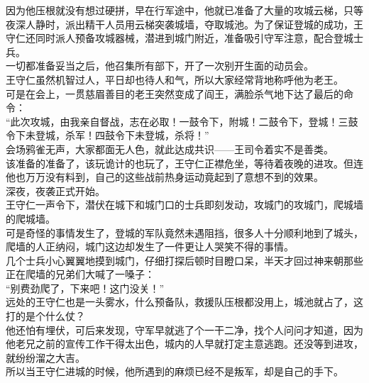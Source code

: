 \begin{multicols}{\theparacolNo}
因为他压根就没有想过硬拼，早在行军途中，他就已准备了大量的攻城云梯，只等夜深人静时，派出精干人员用云梯突袭城墙，夺取城池。为了保证登城的成功，王守仁还同时派人预备攻城器械，潜进到城门附近，准备吸引守军注意，配合登城士兵。\\

一切都准备妥当之后，他召集所有部下，开了一次别开生面的动员会。\\

王守仁虽然机智过人，平日却也待人和气，所以大家经常背地称呼他为老王。\\

可是在会上，一贯慈眉善目的老王突然变成了阎王，满脸杀气地下达了最后的命令：\\

“此次攻城，由我亲自督战，志在必取！一鼓令下，附城！二鼓令下，登城！三鼓令下未登城，杀军！四鼓令下未登城，杀将！”\\

会场鸦雀无声，大家都面无人色，就此达成共识——王司令着实不是善类。\\

该准备的准备了，该玩诡计的也玩了，王守仁正襟危坐，等待着夜晚的进攻。但连他也万万没有料到，自己的这些战前热身运动竟起到了意想不到的效果。\\

深夜，夜袭正式开始。\\

王守仁一声令下，潜伏在城下和城门口的士兵即刻发动，攻城门的攻城门，爬城墙的爬城墙。\\

可是奇怪的事情发生了，登城的军队竟然未遇阻挡，很多人十分顺利地到了城头，爬墙的人正纳闷，城门这边却发生了一件更让人哭笑不得的事情。\\

几个士兵小心翼翼地摸到城门，仔细打探后顿时目瞪口呆，半天才回过神来朝那些正在爬墙的兄弟们大喊了一嗓子：\\

“别费劲爬了，下来吧！这门没关！”\\

远处的王守仁也是一头雾水，什么预备队，救援队压根都没用上，城池就占了，这打的是个什么仗？\\

他还怕有埋伏，可后来发现，守军早就逃了个一干二净，找个人问问才知道，因为他老兄之前的宣传工作干得太出色，城内的人早就打定主意逃跑。还没等到进攻，就纷纷溜之大吉。\\

所以当王守仁进城的时候，他所遇到的麻烦已经不是叛军，却是自己的手下。\\


\end{multicols}
